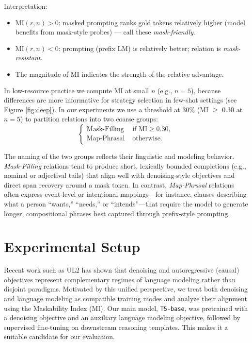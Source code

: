 \documentclass{i4c-en}
\begin{document}
	Interpretation:
	\begin{itemize}
		\item \(\mathrm{MI}(r,n)>0\): masked prompting ranks gold tokens relatively higher (model benefits from mask-style probes) --- call these \emph{mask-friendly}.
		\item \(\mathrm{MI}(r,n)<0\): prompting (prefix LM) is relatively better; relation is \emph{mask-resistant}.
		\item The magnitude of MI indicates the strength of the relative advantage.
	\end{itemize}
	
	In low-resource practice we compute MI at small \(n\) (e.g., \(n=5\)), because differences are more informative for strategy selection in few-shot settings (see Figure \ref{fig:deep}). In our experiments we use a threshold at \(30\%\) (MI $ \geq $ 0.30 at \(n=5\)) to partition relations into two coarse groups:
	\[
	\begin{cases}
		\text{Mask-Filling} & \text{ if } \mathrm{MI}\ge 0.30,\\[3pt]
		\text{Map-Phrasal} & \text{ otherwise.}
	\end{cases}
	\]
	
		The naming of the two groups reflects their linguistic and modeling behavior. \emph{Mask-Filling} relations tend to produce short, lexically bounded completions (e.g., nominal or adjectival tails) that align well with denoising-style objectives and direct span recovery around a mask token. In contrast, \emph{Map-Phrasal} relations often express event-level or intentional mappings---for instance, clauses describing what a person ``wants,'' ``needs,'' or ``intends''---that require the model to generate longer, compositional phrases best captured through prefix-style prompting. 

\section{Experimental Setup}

Recent work such as UL2 \cite{ul2} has shown that denoising and autoregressive (causal) objectives represent complementary regimes of language modeling rather than disjoint paradigms. Motivated by this unified perspective, we treat both denoising and language modeling as compatible training modes and analyze their alignment using the Maskability Index (MI). Our main model, \texttt{T5-base}, was pretrained with a denoising objective and an auxiliary language modeling objective, followed by supervised fine-tuning on downstream reasoning templates. This makes it a suitable candidate for our evaluation.
\end{document}
